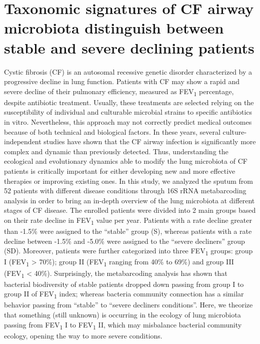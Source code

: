 \section[Taxonomic signatures of CF airway microbiota distinguish between stable and severe declining patients]{Taxonomic signatures of CF airway microbiota distinguish between stable and severe declining patients%
}

Cystic fibrosis (CF) is an autosomal recessive genetic disorder characterized by a progressive decline in lung function. Patients with CF may show a rapid and severe decline of their pulmonary efficiency, measured as FEV\textsubscript{1} percentage, despite antibiotic treatment. Usually, these treatments are selected relying on the susceptibility of individual and culturable microbial strains to specific antibiotics in vitro. Nevertheless, this approach may not correctly predict medical outcomes because of both technical and biological factors. In these years, several culture-independent studies have shown that the CF airway infection is significantly more complex and dynamic than previously detected. Thus, understanding the ecological and evolutionary dynamics able to modify the lung microbiota of CF patients is critically important for either developing new and more effective therapies or improving existing ones. In this study, we analyzed the sputum from 52 patients with different disease conditions through 16S rRNA metabarcoding analysis in order to bring an in-depth overview of the lung microbiota at different stages of CF disease. The enrolled patients were divided into 2 main groups based on their rate decline in FEV\textsubscript{1} value per year. Patients with a rate decline greater than -1.5\% were assigned to the ``stable'' group (S), whereas patients with a rate decline between -1.5\% and -5.0\% were assigned to the ``severe decliners'' group (SD). Moreover, patients were further categorized into three FEV\textsubscript{1} groups: group I (FEV\textsubscript{1} {\textgreater} 70\%); group II (FEV\textsubscript{1} ranging from 40\% to 69\%) and group III (FEV\textsubscript{1} {\textless} 40\%). Surprisingly, the metabarcoding analysis has shown that bacterial biodiversity of stable patients dropped down passing from group I to group II of FEV\textsubscript{1} index; whereas bacteria community connection has a similar behavior passing from ``stable'' to ``severe decliners conditions''. Here, we theorize that something (still unknown) is occurring in the ecology of lung microbiota passing from FEV\textsubscript{1} I to FEV\textsubscript{1} II, which may misbalance bacterial community ecology, opening the way to more severe conditions.\\

